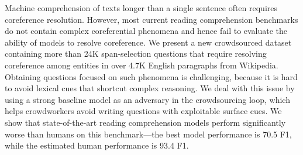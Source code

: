 Machine comprehension of texts longer than a single sentence often requires coreference resolution. However, most current reading comprehension benchmarks do not contain complex coreferential phenomena and hence fail to evaluate the ability of models to resolve coreference.
We present a new crowdsourced dataset containing more than 24K span-selection questions that require resolving coreference among entities in over 4.7K English paragraphs from Wikipedia. Obtaining questions focused on such phenomena is challenging, because it is hard to avoid lexical cues that shortcut complex reasoning.
We deal with this issue by using a strong baseline model as an adversary in the crowdsourcing loop, which helps crowdworkers avoid writing questions with exploitable surface cues. We show that state-of-the-art reading comprehension models perform significantly worse than humans on this benchmark---the best model performance is 70.5 F1, while the estimated human performance is 93.4 F1.
